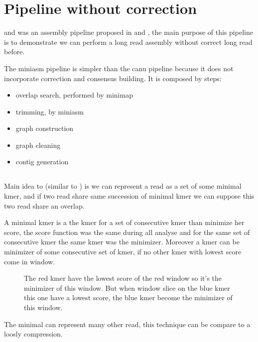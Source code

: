 \documentclass[main]{subfiles}
\begin{document}
\section{Pipeline without correction \miniasm} \label{section:sota:miniasm}

\minimap and \miniasm was an assembly pipeline proposed in \cite{miniasm_minimap} and \cite{minimap2}, the main purpose of this pipeline is to demonstrate we can perform a long read assembly without correct long read before.

The miniasm pipeline is simpler than the canu pipeline because it does not incorporate correction and consensus building. It is composed by steps:
\begin{itemize}
    \item overlap search, performed by minimap
    \item trimming, by miniasm
    \item graph construction 
    \item graph cleaning
    \item contig generation
\end{itemize}


\subsection{\minimap} \label{subsec:sota:miniasm:minimap}

Main idea to \minimap (similar to \mhap) is we can represent a read as a set of some minimal kmer, and if two read share same succession of minimal kmer we can suppose this two read share an overlap.

A minimal kmer is a the kmer for a set of consecutive kmer than minimize her score, the score function was the same during all analyse and for the same set of consecutive kmer the same kmer was the minimizer. Moreover a kmer can be minimizer of some consecutive set of kmer, if no other kmer with lowest score come in window. 

\begin{figure}[ht]
    \centering
    
    \caption{The red kmer have the lowest score of the red window so it's the minimizer of this window. But when window slice on the blue kmer this one have a lowest score, the blue kmer become the minimizer of this window.}
    \label{sota:fig:miniasm:minimizer}
\end{figure}

The minimal \kmer can represent many other read, this technique can be compare to a loosly compression.
\end{document}
